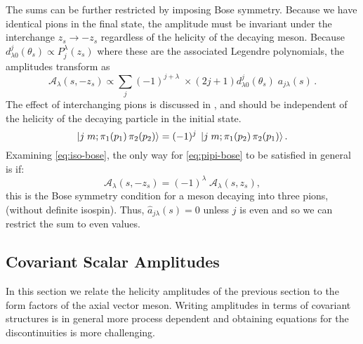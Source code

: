 \documentclass[10pt, aps,prd,amsmath,amssymb,superscriptaddress,onecolumn,
nofootinbib,showpacs,preprintnumbers]{revtex4-1}
\begin{document}
The sums can be further restricted by imposing Bose symmetry. Because we have identical pions in the final state, the amplitude must be invariant under the interchange \(z_s \to -z_s\) regardless of the helicity of the decaying meson.
Because \(d^j_{\lambda0}(\theta_s) \propto P^\lambda_j(z_s)\) where these are the associated Legendre polynomials, the amplitudes transform as
  \begin{equation}
    \label{eq:iso-bose}
   \mathcal{A}_\lambda(s, -z_s) \propto \sum_{j} (-1)^{j+\lambda} \; \times (2j+1) d^j_{\lambda0}(\theta_s) \; a_{j\lambda}(s) \,.
  \end{equation}
The effect of interchanging pions is discussed in \cite{JACOB1959404}, and should be independent of the helicity of the decaying particle in the initial state.
  \begin{equation}
    \label{eq:pipi-bose}
    \ket{j \; m ; \pi_1(p_1) \, \pi_2(p_2)} = (-1)^j \; \ket{j \; m; \pi_1(p_2) \, \pi_2(p_1)}.
  \end{equation}
Examining \cref{eq:iso-bose}, the only way for \cref{eq:pipi-bose} to be satisfied in general is if:
  \begin{equation}
    \label{eq:helicity-bose}
    \mathcal{A}_\lambda(s,-z_s) = (-1)^\lambda \; \mathcal{A}_\lambda(s, z_s),
  \end{equation}
this is the Bose symmetry condition for a meson decaying into three pions, (without definite isospin).
Thus, \(\hat{a}_{j\lambda}(s) = 0\) unless \(j\) is even and so we can restrict the sum to even values.
 \subsection{Covariant Scalar Amplitudes}
 In this section we relate the helicity amplitudes of the previous section to the form factors of the axial vector meson. Writing amplitudes in terms of covariant structures is in general more process dependent and obtaining equations for the discontinuities is more challenging.
\end{document}
